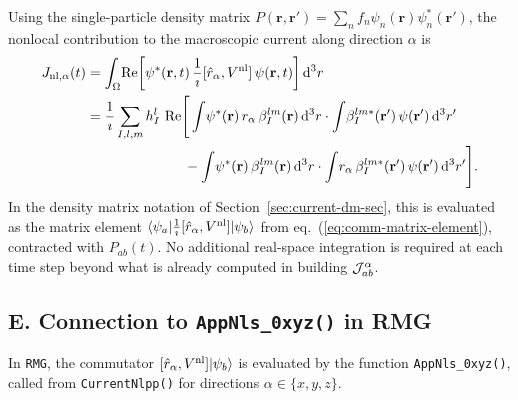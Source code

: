 Using the single-particle density matrix $P(\mathbf{r},\mathbf{r}')
= \sum_n f_n \psi_n(\mathbf{r})\psi_n^*(\mathbf{r}')$, the
nonlocal contribution to the macroscopic current along direction
$\alpha$ is
\begin{align}
  J_{\mathrm{nl},\alpha}(t)
  &= \int_\Omega\!
     \operatorname{Re}\!\left[
       \psi^*(\mathbf{r},t)\,
       \frac{1}{\imath}[\hat{r}_\alpha,V^{\mathrm{nl}}]\,
       \psi(\mathbf{r},t)
     \right]\mathrm{d}^3r
  \nonumber \\
  &= \frac{1}{\imath}\sum_{I,l,m} h^l_I\,
     \operatorname{Re}\!\Bigg[
       \int\!\psi^*(\mathbf{r})\,r_\alpha\,\beta^{lm}_I(\mathbf{r})
       \,\mathrm{d}^3r
       \cdot
       \int\!\beta^{lm*}_I(\mathbf{r}')\,\psi(\mathbf{r}')
       \,\mathrm{d}^3r'
  \nonumber \\
  &\qquad\qquad\qquad\quad
   - \int\!\psi^*(\mathbf{r})\,\beta^{lm}_I(\mathbf{r})
     \,\mathrm{d}^3r
     \cdot
     \int\!r_\alpha\,\beta^{lm*}_I(\mathbf{r}')\,\psi(\mathbf{r}')
     \,\mathrm{d}^3r'
     \Bigg].
  \label{eq:Jnl-full}
\end{align}
In the density matrix notation of Section~\ref{sec:current-dm-sec},
this is evaluated as the matrix element
$\langle\psi_a|\frac{1}{\imath}[\hat{r}_\alpha,V^{\mathrm{nl}}]|\psi_b\rangle$
from eq.~(\ref{eq:comm-matrix-element}), contracted with $P_{ab}(t)$.
No additional real-space integration is required at each time step
beyond what is already computed in building $\mathcal{J}^{\alpha}_{ab}$.

\subsection*{E.\; Connection to \texttt{AppNls\_0xyz()} in RMG}
\label{app:code-connection}

In \texttt{RMG}, the commutator $[\hat{r}_\alpha,V^{\mathrm{nl}}]|\psi_b\rangle$
is evaluated by the function \texttt{AppNls\_0xyz()}, called from
\texttt{CurrentNlpp()} for directions $\alpha \in \{x,y,z\}$.

